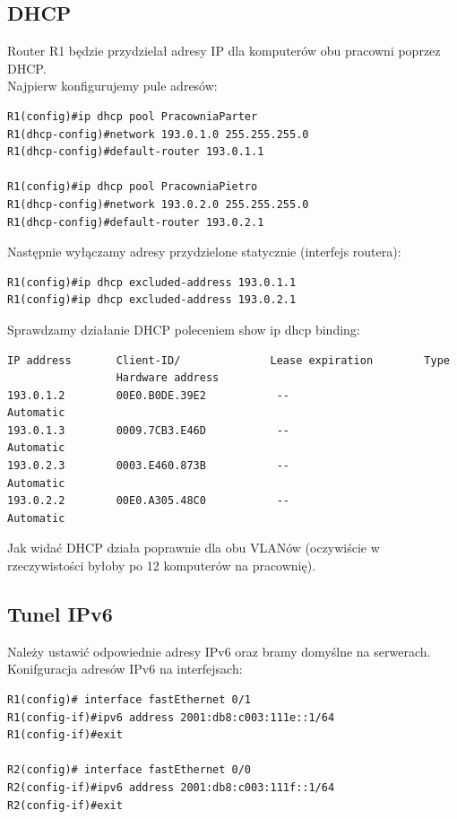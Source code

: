 \documentclass[11pt,a4paper]{article}
\begin{document}

\subsection{DHCP}
Router R1 będzie przydzielał adresy IP dla komputerów obu pracowni poprzez DHCP.\\
Najpierw konfigurujemy pule adresów:
\begin{lstlisting}
R1(config)#ip dhcp pool PracowniaParter
R1(dhcp-config)#network 193.0.1.0 255.255.255.0
R1(dhcp-config)#default-router 193.0.1.1

R1(config)#ip dhcp pool PracowniaPietro
R1(dhcp-config)#network 193.0.2.0 255.255.255.0
R1(dhcp-config)#default-router 193.0.2.1
\end{lstlisting}
Następnie wyłączamy adresy przydzielone statycznie (interfejs routera):
\begin{lstlisting}
R1(config)#ip dhcp excluded-address 193.0.1.1
R1(config)#ip dhcp excluded-address 193.0.2.1
\end{lstlisting}
Sprawdzamy działanie DHCP poleceniem show ip dhcp binding:
\begin{lstlisting}
IP address       Client-ID/              Lease expiration        Type
                 Hardware address
193.0.1.2        00E0.B0DE.39E2           --                     Automatic
193.0.1.3        0009.7CB3.E46D           --                     Automatic
193.0.2.3        0003.E460.873B           --                     Automatic
193.0.2.2        00E0.A305.48C0           --                     Automatic
\end{lstlisting}
Jak widać DHCP działa poprawnie dla obu VLANów (oczywiście w rzeczywistości byłoby po 12 komputerów na pracownię).

\subsection{Tunel IPv6}

\noindent
Należy ustawić odpowiednie adresy IPv6 oraz bramy domyślne na serwerach.
\noindent
Konifguracja adresów IPv6 na interfejsach:
\begin{lstlisting}
R1(config)# interface fastEthernet 0/1
R1(config-if)#ipv6 address 2001:db8:c003:111e::1/64
R1(config-if)#exit

R2(config)# interface fastEthernet 0/0
R2(config-if)#ipv6 address 2001:db8:c003:111f::1/64
R2(config-if)#exit
\end{lstlisting}
\end{document}
